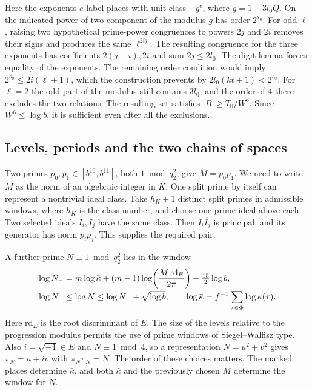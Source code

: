 Here the exponents \(e\) label places with unit class \(-g^e\), where \(g=1+3l_0Q\). On the indicated power-of-two component of the modulus \(g\) has order \(2^{s_0}\). For odd \(\ell\), raising two hypothetical prime-power congruences to powers \(2j\) and \(2i\) removes their signs and produces the same \(\ell^{2ij}\). The resulting congruence for the three exponents has coefficients \(2(j-i),2i\) and sum \(2j\le2l_0\). The digit lemma forces equality of the exponents. The remaining order condition would imply \(2^{s_0}\le2i(\ell+1)\), which the construction prevents by \(2l_0(kt+1)<2^{s_0}\). For \(\ell=2\) the odd part of the modulus still contains \(3l_0\), and the order of \(4\) there excludes the two relations. The resulting set satisfies \(|B|\ge T_0/W^6\). Since \(W^6\le\log b\), it is sufficient even after all the exclusions.

\subsection{Levels, periods and the two chains of spaces}
Two primes \(p_0,p_1\in[b^{10},b^{11}]\), both \(1\bmod q_2^2\), give \(M=p_0p_1\). We need to write \(M\) as the norm of an algebraic integer in \(K\). One split prime by itself can represent a nontrivial ideal class. Take \(h_K+1\) distinct split primes in admissible windows, where \(h_K\) is the class number, and choose one prime ideal above each. Two selected ideals \(I_i,I_j\) have the same class. Then \(I_i\overline{I_j}\) is principal, and its generator has norm \(p_ip_j\). This supplies the required pair.

A further prime \(N\equiv1\bmod q_2^2\) lies in the window
\begin{align}
 \log N_-&=m\log\bar\kappa+(m-1)\log\!\left(\frac{M\,\mathrm{rd}_E}{2\pi}\right)
                       -\tfrac{15}{2}\log b,\label{eq:Nlevel}\\[-2pt]
 \log N_-&\le\log N\le\log N_-+\sqrt{\log b},\qquad
 \log\bar\kappa=f^{-1}\sum_{\tau\in\Phi}\log\kappa(\tau).\notag
\end{align}
Here \(\mathrm{rd}_E\) is the root discriminant of \(E\). The size of the levels relative to the progression modulus permits the use of prime windows of Siegel--Walfisz type. Also \(i=\sqrt{-1}\in E\) and \(N\equiv1\bmod4\), so a representation \(N=u^2+v^2\) gives \(\pi_N=u+iv\) with \(\pi_N\overline{\pi_N}=N\). The order of these choices matters. The marked places determine \(\bar\kappa\), and both \(\bar\kappa\) and the previously chosen \(M\) determine the window for \(N\).


